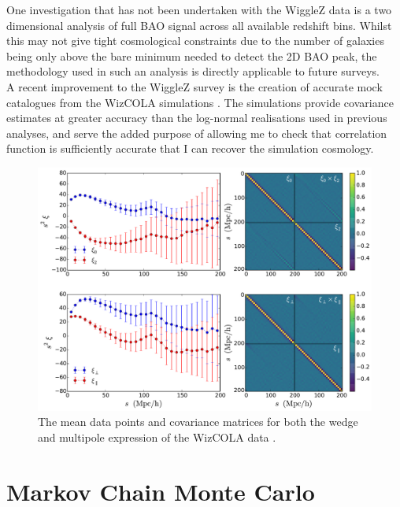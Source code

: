 \documentclass[titlesmallcaps, examinerscopy, copyrightpage]{uqthesis}
\begin{document}
One investigation that has not been undertaken with the WiggleZ data is a two dimensional analysis of full BAO signal across all available redshift bins. Whilst this may not give tight cosmological constraints due to the number of galaxies being only above the bare minimum needed to detect the 2D BAO peak, the methodology used in such an analysis is directly applicable to future surveys.\\

A recent improvement to the WiggleZ survey is the creation of accurate mock catalogues from the WizCOLA simulations \citep{KodaBlake2015}. The simulations provide covariance estimates at greater accuracy than the log-normal realisations used in previous analyses, and serve the added purpose of allowing me to check that correlation function is sufficiently accurate that I can recover the simulation cosmology.\\

\begin{figure}[h!]
  \begin{center}
    \includegraphics[width=\textwidth]{images/wizcola.pdf}
  \end{center}
  \caption{The mean data points and covariance matrices for both the wedge and multipole expression of the WizCOLA data \citep{KazinKoda2014,KodaBlake2015}.}
  \label{fig:wizcola}
\end{figure}



\section{Markov Chain Monte Carlo}
\end{document}
